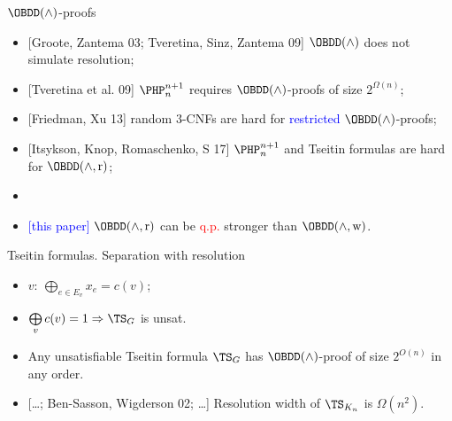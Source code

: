 \begin{frame}{$\OBDD(\land)$-proofs}
    \begin{itemize}
        \item{} [Groote, Zantema 03; Tveretina, Sinz, Zantema 09] $\OBDD(\land)$ does not simulate
            resolution;
        \pause
        \item{} [Tveretina et al. 09] $\PHP^{n + 1}_n$ requires $\OBDD(\land)$-proofs of size
            $2^{\Omega(n)}$;
        \pause
        \item{} [Friedman, Xu 13] random $3$-CNFs are hard for \textcolor{blue}{restricted}
            $\OBDD(\land)$-proofs;
        \pause
        \item{} [Itsykson, Knop, Romaschenko, S 17] $\PHP^{n + 1}_{n}$ and Tseitin formulas are hard for
            $\OBDD(\land, \reordering)$;
        \pause
        \item{} 
        \pause
        \pause    
        \item{} \textcolor{blue}{[this paper]} $\OBDD(\land, \reordering)$ can be \textcolor{red}{q.p.}
            stronger than $\OBDD(\land, \weakening)$.
    \end{itemize}    
\end{frame}


\begin{frame}{Tseitin formulas. Separation with resolution}

    \begin{minipage}{0.5 \linewidth}
        
    \end{minipage}%
    \begin{minipage}{0.5 \linewidth}
        \begin{itemize}
            \item $v: ~ \bigoplus\limits_{e \in E_v} x_{e} = c(v)$;
            \item $\bigoplus\limits_{v} c(v) = 1 \Rightarrow \TS_G$ is unsat. 
        \end{itemize}
    \end{minipage}


    \pause
    \begin{itemize}
        \item Any unsatisfiable Tseitin formula $\TS_{G}$ has $\OBDD(\land)$-proof of size $2^{O(n)}$
            in any order.
        \item{} [\dots; Ben-Sasson, Wigderson 02; \dots] Resolution width of $\TS_{K_n}$ is $\Omega(n^2)$.
    \end{itemize}
\end{frame}


